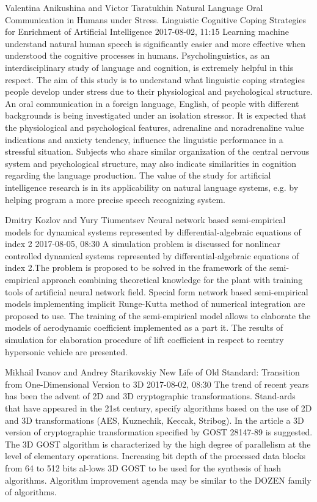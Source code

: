 \documentclass[10pt,fleqn,openany]{book} %
\begin{document}
\begin{enumerate}
		
		\paperabstract
		{Valentina Anikushina and Victor Taratukhin}
		{Natural Language Oral Communication in Humans under Stress. Linguistic Cognitive Coping Strategies for Enrichment of Artificial Intelligence}
		{2017-08-02, 11:15}
		{Learning machine understand natural human speech is significantly easier and more effective when understood the cognitive processes in humans. Psycholinguistics, as an interdisciplinary study of language and cognition, is extremely helpful in this respect.  The aim of this study is to understand what linguistic coping strategies people develop under stress due to their physiological and psychological structure. An oral communication in a foreign language, English, of people with different backgrounds is being investigated under an isolation stressor. It is expected that the physiological and psychological features, adrenaline and noradrenaline value indications and anxiety tendency, influence the linguistic performance in a stressful situation. Subjects who share similar organization of the central nervous system and psychological structure, may also indicate similarities in cognition regarding the language production.  The value of the study for artificial intelligence research is in its applicability on natural language systems, e.g. by helping program a more precise speech recognizing system.}
		
		
		\paperabstract
		{Dmitry Kozlov and Yury Tiumentsev}
		{Neural network based semi-empirical models for dynamical systems represented by differential-algebraic equations of index 2}
		{2017-08-05, 08:30}
		{A simulation problem is discussed for nonlinear controlled dynamical systems represented by differential-algebraic equations of index 2.The problem is proposed to be solved in the framework of the semi-empirical approach combining theoretical knowledge for the plant with training tools of artificial neural network field. Special form network based semi-empirical models implementing implicit Runge-Kutta method of numerical integration are proposed to use. The training of the semi-empirical model allows to elaborate the models of aerodynamic coefficient implemented as a part it. The results of simulation for elaboration procedure of lift coefficient in respect to reentry hypersonic vehicle are presented.}
		
		
		\paperabstract
		{Mikhail Ivanov and Andrey Starikovskiy}
		{New Life of Old Standard: Transition from One-Dimensional Version to 3D}
		{2017-08-02, 08:30}
		{The trend of recent years has been the advent of 2D and 3D cryptographic transformations. Stand-ards that have appeared in the 21st century, specify algorithms based on the use of 2D and 3D transformations (AES, Kuznechik, Keccak, Stribog). In the article a 3D version of cryptographic transformation specified by GOST 28147-89 is suggested. The 3D GOST algorithm is characterized by the high degree of parallelism at the level of elementary operations. Increasing bit depth of the processed data blocks from 64 to 512 bits al-lows 3D GOST to be used for the synthesis of hash algorithms. Algorithm improvement agenda may be similar to the DOZEN family of algorithms.}
		

\end{enumerate}
\end{document}
